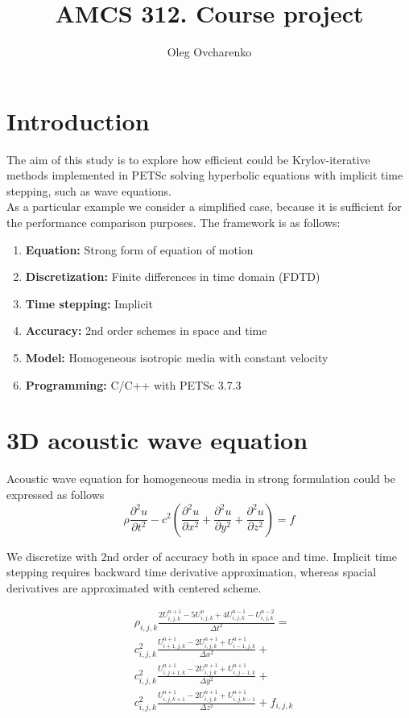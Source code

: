 \documentclass[12pt,a4paper]{report}
\title{AMCS 312. Course project}
\author{Oleg Ovcharenko}
\begin{document}
\maketitle
\section*{Introduction}
The aim of this study is to explore how efficient could be Krylov-iterative methods implemented in PETSc solving hyperbolic equations with implicit time stepping, such as wave equations.\\

As a particular example we consider a simplified case, because it is sufficient for the performance comparison purposes. The framework is as follows:
\begin{enumerate}
\item[] \textbf{Equation:} Strong form of equation of motion
\item[] \textbf{Discretization:} Finite differences in time domain (FDTD)
\item[] \textbf{Time stepping:} Implicit
\item[] \textbf{Accuracy:} 2nd order schemes in space and time
\item[] \textbf{Model:} Homogeneous isotropic media with constant velocity
\item[] \textbf{Programming:} C/C++ with PETSc 3.7.3\\
\end{enumerate} 

\section*{3D acoustic wave equation}
Acoustic wave equation for homogeneous media in strong formulation could be expressed as follows
\begin{equation}
\rho \frac{\partial^2 u}{\partial t^2} - c^2 \left(\frac{\partial^2 u}{\partial x^2} + \frac{\partial^2 u}{\partial y^2} + \frac{\partial^2 u}{\partial z^2}\right) = f
\end{equation}

We discretize with 2nd order of accuracy both in space and time. Implicit time stepping requires backward time derivative approximation, whereas spacial derivatives are approximated with centered scheme.

\begin{equation}
\begin{aligned}
& \rho_{i,j,k} \frac{2 U^{n+1}_{i,j,k} - 5 U^{n}_{i,j,k} + 4 U^{n-1}_{i,j,k} - U^{n-2}_{i,j,k}}{\Delta t^2} = \\
& c^2_{i,j,k} \frac{U^{n+1}_{i+1,j,k} - 2 U^{n+1}_{i,j,k} + U^{n+1}_{i-1,j,k}}{\Delta x^2} +\\
& c^2_{i,j,k} \frac{U^{n+1}_{i,j+1,k} - 2 U^{n+1}_{i,j,k} + U^{n+1}_{i,j-1,k}}{\Delta y^2} + \\
& c^2_{i,j,k} \frac{U^{n+1}_{i,j,k+1} - 2 U^{n+1}_{i,j,k} + U^{n+1}_{i,j,k-1}}{\Delta z^2} + f_{i,j,k}
\end{aligned}
\end{equation}
\end{document}
